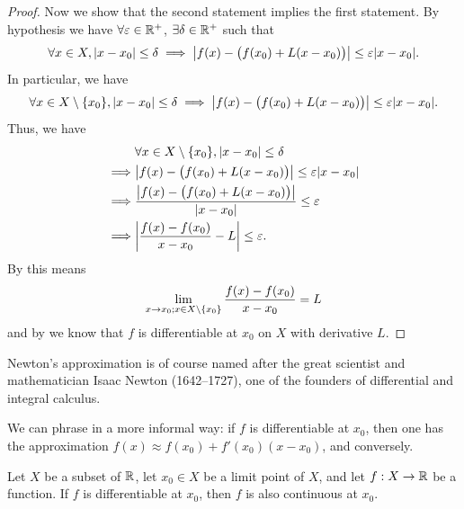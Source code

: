 \begin{proof}
  Now we show that the second statement implies the first statement.
  By hypothesis we have \(\forall \varepsilon \in \mathbb{R}^+\), \(\exists \delta \in \mathbb{R}^+\) such that
  \[
    \forall x \in X, \abs{x - x_0} \leq \delta \implies \abs{f(x) - \big(f(x_0) + L(x - x_0)\big)} \leq \varepsilon \abs{x - x_0}.
  \]
  In particular, we have
  \[
    \forall x \in X \setminus \set{x_0}, \abs{x - x_0} \leq \delta \implies \abs{f(x) - \big(f(x_0) + L(x - x_0)\big)} \leq \varepsilon \abs{x - x_0}.
  \]
  Thus, we have
  \begin{align*}
             & \forall x \in X \setminus \set{x_0}, \abs{x - x_0} \leq \delta                     \\
    \implies & \abs{f(x) - \big(f(x_0) + L(x - x_0)\big)} \leq \varepsilon \abs{x - x_0}          \\
    \implies & \dfrac{\abs{f(x) - \big(f(x_0) + L(x - x_0)\big)}}{\abs{x - x_0}} \leq \varepsilon \\
    \implies & \abs{\dfrac{f(x) - f(x_0)}{x - x_0} - L} \leq \varepsilon.
  \end{align*}
  By  this means
  \[
    \lim_{x \to x_0 ; x \in X \setminus \left\lbrace x_0\right\rbrace} \dfrac{f(x) - f(x_0)}{x - x_0} = L
  \]
  and by  we know that \(f\) is differentiable at \(x_0\) on \(X\) with derivative \(L\).
\end{proof}

\begin{rmk}\label{i:10.1.8}
  Newton's approximation is of course named after the great scientist and mathematician Isaac Newton (1642--1727), one of the founders of differential and integral calculus.
\end{rmk}

\begin{rmk}\label{i:10.1.9}
  We can phrase  in a more informal way:
  if \(f\) is differentiable at \(x_0\), then one has the approximation \(f(x) \approx f(x_0) + f'(x_0)(x - x_0)\), and conversely.
\end{rmk}

\begin{prop}\label{i:10.1.10}
  Let \(X\) be a subset of \(\mathbb{R}\), let \(x_0 \in X\) be a limit point of \(X\), and let \(f : X \to \mathbb{R}\) be a function.
  If \(f\) is differentiable at \(x_0\), then \(f\) is also continuous at \(x_0\).
\end{prop}

